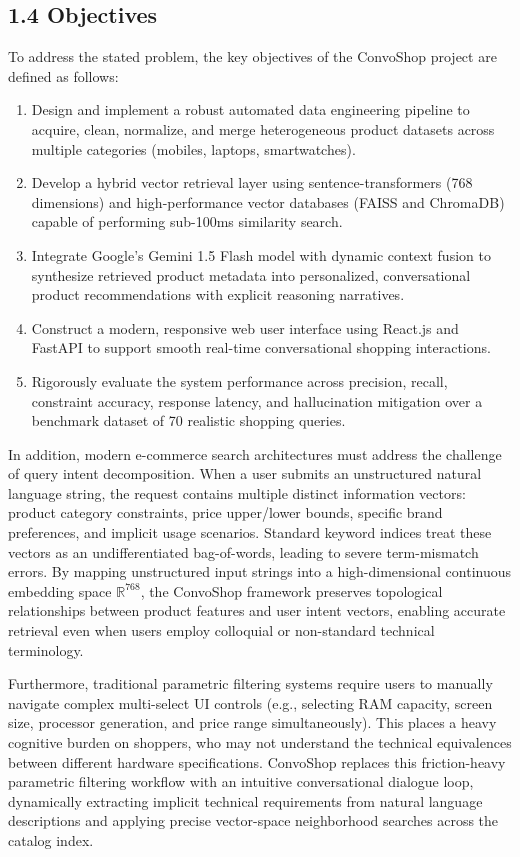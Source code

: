 \documentclass[12pt,a4paper]{article}
\begin{document}
\subsection*{1.4 Objectives}
\label{sec:1.4}
To address the stated problem, the key objectives of the ConvoShop project are defined as follows:
\begin{enumerate}
    \item Design and implement a robust automated data engineering pipeline to acquire, clean, normalize, and merge heterogeneous product datasets across multiple categories (mobiles, laptops, smartwatches).
    \item Develop a hybrid vector retrieval layer using sentence-transformers (768 dimensions) and high-performance vector databases (FAISS and ChromaDB) capable of performing sub-100ms similarity search.
    \item Integrate Google's Gemini 1.5 Flash model with dynamic context fusion to synthesize retrieved product metadata into personalized, conversational product recommendations with explicit reasoning narratives.
    \item Construct a modern, responsive web user interface using React.js and FastAPI to support smooth real-time conversational shopping interactions.
    \item Rigorously evaluate the system performance across precision, recall, constraint accuracy, response latency, and hallucination mitigation over a benchmark dataset of 70 realistic shopping queries.
\end{enumerate}



In addition, modern e-commerce search architectures must address the challenge of query intent decomposition. When a user submits an unstructured natural language string, the request contains multiple distinct information vectors: product category constraints, price upper/lower bounds, specific brand preferences, and implicit usage scenarios. Standard keyword indices treat these vectors as an undifferentiated bag-of-words, leading to severe term-mismatch errors. By mapping unstructured input strings into a high-dimensional continuous embedding space $\mathbb{R}^{768}$, the ConvoShop framework preserves topological relationships between product features and user intent vectors, enabling accurate retrieval even when users employ colloquial or non-standard technical terminology.

Furthermore, traditional parametric filtering systems require users to manually navigate complex multi-select UI controls (e.g., selecting RAM capacity, screen size, processor generation, and price range simultaneously). This places a heavy cognitive burden on shoppers, who may not understand the technical equivalences between different hardware specifications. ConvoShop replaces this friction-heavy parametric filtering workflow with an intuitive conversational dialogue loop, dynamically extracting implicit technical requirements from natural language descriptions and applying precise vector-space neighborhood searches across the catalog index.
\end{document}
